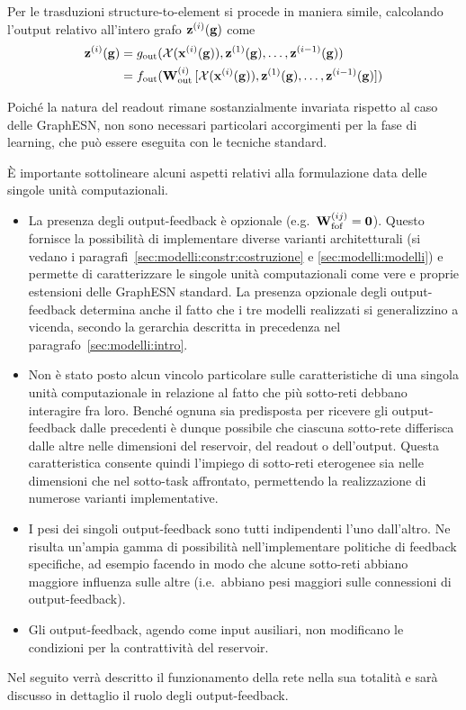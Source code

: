 Per le trasduzioni structure-to-element si procede in maniera simile, calcolando l'output relativo all'intero grafo $\mathbf{z}^{(i)}(\mathbf{g})$ come
\begin{equation}
\begin{split}
\vect{z}^{(i)}(\graph{g}) 
	&= g_\textup{out}( \mathcal{X}(\vect{x}^{(i)}(\graph{g})), \vect{z}^{(1)}(\graph{g}), \dots, \vect{z}^{(i-1)}(\graph{g}) ) \\
	&= f_\textup{out}( \matr{W}^{(i)}_\textup{out} \,
		[\mathcal{X}(\vect{x}^{(i)}(\graph{g})), \vect{z}^{(1)}(\graph{g}), \dots, \vect{z}^{(i-1)}(\graph{g})] )
\end{split}
\end{equation}

Poiché la natura del readout rimane sostanzialmente invariata rispetto al caso delle GraphESN, non sono necessari particolari accorgimenti per la fase di learning, che può essere eseguita con le tecniche standard.

\`E importante sottolineare alcuni aspetti relativi alla formulazione data delle singole unità computazionali.
\begin{itemize}
\item La presenza degli output-feedback è opzionale (e.g.\ $\matr{W}^{(ij)}_\textup{fof} = \vect{0}$). Questo fornisce la possibilità di implementare diverse varianti architetturali (si vedano i paragrafi~\ref{sec:modelli:constr:costruzione} e \ref{sec:modelli:modelli}) e permette di caratterizzare le singole unità computazionali come vere e proprie estensioni delle GraphESN standard. La presenza opzionale degli output-feedback determina anche il fatto che i tre modelli realizzati si generalizzino a vicenda, secondo la gerarchia descritta in precedenza nel paragrafo~\ref{sec:modelli:intro}.

\item Non è stato posto alcun vincolo particolare sulle caratteristiche di una singola unità computazionale in relazione al fatto che più sotto-reti debbano interagire fra loro. Benché ognuna sia predisposta per ricevere gli output-feedback dalle precedenti è dunque possibile che ciascuna sotto-rete differisca dalle altre nelle dimensioni del reservoir, del readout o dell'output. Questa caratteristica consente quindi l'impiego di sotto-reti eterogenee sia nelle dimensioni che nel sotto-task affrontato, permettendo la realizzazione di numerose varianti implementative.

\item I pesi dei singoli output-feedback sono tutti indipendenti l'uno dall'altro. Ne risulta un'ampia gamma di possibilità nell'implementare politiche di feedback specifiche, ad esempio facendo in modo che alcune sotto-reti abbiano maggiore influenza sulle altre (i.e.\ abbiano pesi maggiori sulle connessioni di output-feedback).

\item Gli output-feedback, agendo come input ausiliari, non modificano le condizioni per la contrattività del reservoir.
\end{itemize}
Nel seguito verrà descritto il funzionamento della rete nella sua totalità e sarà discusso in dettaglio il ruolo degli output-feedback.


